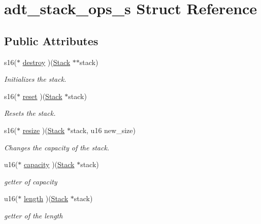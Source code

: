 \hypertarget{structadt__stack__ops__s}{}\section{adt\+\_\+stack\+\_\+ops\+\_\+s Struct Reference}
\label{structadt__stack__ops__s}
\subsection*{Public Attributes}
\begin{DoxyCompactItemize}
\item 
s16($\ast$ \hyperlink{structadt__stack__ops__s_ad3a6a6641cf29b37d37eabe475edb80d}{destroy} )(\hyperlink{structadt__stack__s}{Stack} $\ast$$\ast$stack)
\begin{DoxyCompactList}\small\item\em Initializes the stack. \end{DoxyCompactList}\item 
s16($\ast$ \hyperlink{structadt__stack__ops__s_a947c226930bfa114fdd0daaf41959fab}{reset} )(\hyperlink{structadt__stack__s}{Stack} $\ast$stack)
\begin{DoxyCompactList}\small\item\em Resets the stack. \end{DoxyCompactList}\item 
s16($\ast$ \hyperlink{structadt__stack__ops__s_a8b7b66eb29da8fb49b3626354a30d3a4}{resize} )(\hyperlink{structadt__stack__s}{Stack} $\ast$stack, u16 new\+\_\+size)
\begin{DoxyCompactList}\small\item\em Changes the capacity of the stack. \end{DoxyCompactList}\item 
u16($\ast$ \hyperlink{structadt__stack__ops__s_af16d5aec35876e8824938765a9001461}{capacity} )(\hyperlink{structadt__stack__s}{Stack} $\ast$stack)
\begin{DoxyCompactList}\small\item\em getter of capacity \end{DoxyCompactList}\item 
u16($\ast$ \hyperlink{structadt__stack__ops__s_ae77aa49422bbfe038dd3f9eb93e14882}{length} )(\hyperlink{structadt__stack__s}{Stack} $\ast$stack)
\begin{DoxyCompactList}\small\item\em getter of the length \end{DoxyCompactList}\item 
$$
\end{DoxyCompactItemize}
